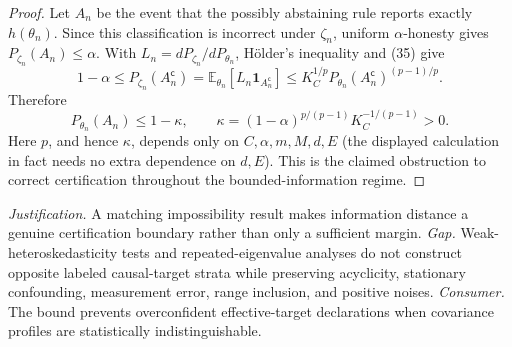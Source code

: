 \documentclass{article}
\begin{document}
\begin{proof}
Let \(A_n\) be the event that the possibly abstaining rule reports exactly \(h(\theta_n)\).  Since this classification is incorrect under \(\zeta_n\), uniform \(\alpha\)-honesty gives \(P_{\zeta_n}(A_n)\le\alpha\).  With \(L_n=dP_{\zeta_n}/dP_{\theta_n}\), H\"older's inequality and (35) give
\[
 1-\alpha
 \le P_{\zeta_n}(A_n^{\mathsf c})
 =\mathbb E_{\theta_n}[L_n\mathbf 1_{A_n^{\mathsf c}}]
 \le K_C^{1/p}P_{\theta_n}(A_n^{\mathsf c})^{(p-1)/p}. \tag{36}
\]
Therefore
\[
 P_{\theta_n}(A_n)\le1-\kappa,
 \qquad
 \kappa=(1-\alpha)^{p/(p-1)}K_C^{-1/(p-1)}>0. \tag{37}
\]
Here \(p\), and hence \(\kappa\), depends only on \(C,\alpha,m,M,d,E\) (the displayed calculation in fact needs no extra dependence on \(d,E\)).  This is the claimed obstruction to correct certification throughout the bounded-information regime.
\end{proof}
\par\smallskip\noindent \textit{Justification.} A matching impossibility result makes information distance a genuine certification boundary rather than only a sufficient margin. \textit{Gap.} Weak-heteroskedasticity tests and repeated-eigenvalue analyses do not construct opposite labeled causal-target strata while preserving acyclicity, stationary confounding, measurement error, range inclusion, and positive noises. \textit{Consumer.} The bound prevents overconfident effective-target declarations when covariance profiles are statistically indistinguishable.
\end{document}
